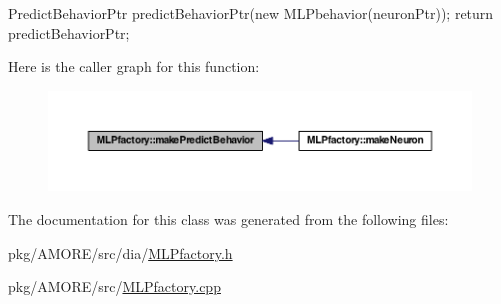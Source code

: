 \begin{DoxyCode}
{
  PredictBehaviorPtr predictBehaviorPtr(new MLPbehavior(neuronPtr));
  return predictBehaviorPtr;
}
\end{DoxyCode}


Here is the caller graph for this function:
\nopagebreak
\begin{figure}[H]
\begin{center}
\leavevmode
\includegraphics[width=400pt]{class_m_l_pfactory_a9e9e9bb4390df09c78a24c4ff79cdab6_icgraph}
\end{center}
\end{figure}




The documentation for this class was generated from the following files:\begin{DoxyCompactItemize}
\item 
pkg/AMORE/src/dia/\hyperlink{_m_l_pfactory_8h}{MLPfactory.h}\item 
pkg/AMORE/src/\hyperlink{_m_l_pfactory_8cpp}{MLPfactory.cpp}\end{DoxyCompactItemize}
